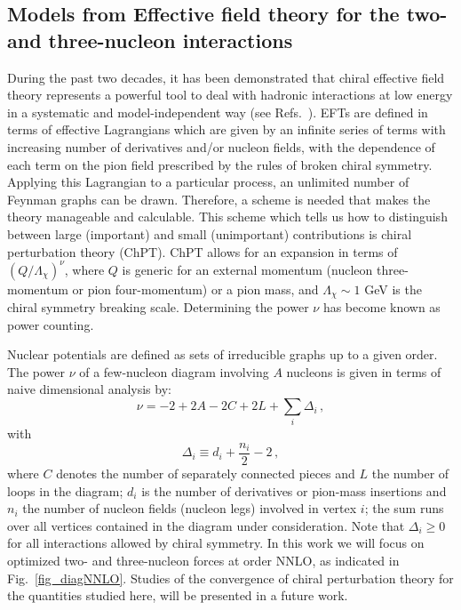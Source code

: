 \subsection{Models from Effective field theory for the two- and three-nucleon interactions}\label{subsec:forcemodels}

During the past two decades, it has been demonstrated that chiral
effective field theory represents a powerful tool to deal with
hadronic interactions at low energy in a systematic and
model-independent way (see
Refs.~\cite{weinberg1990,weinberg1991,ordonez1992,ordonez1994,ordonez1996,vankolck1999,machleidt2011,epelbaum2009,ekstrom2013}).
EFTs are defined in terms of effective Lagrangians which are given by
an infinite series of terms with increasing number of derivatives
and/or nucleon fields, with the dependence of each term on the pion
field prescribed by the rules of broken chiral symmetry.  Applying
this Lagrangian to a particular process, an unlimited number of
Feynman graphs can be drawn. Therefore, a scheme is needed that makes
the theory manageable and calculable.  This scheme which tells us how
to distinguish between large (important) and small (unimportant)
contributions is chiral perturbation theory (ChPT).  ChPT allows for
an expansion in terms of $(Q/\Lambda_\chi)^\nu$, where $Q$ is generic
for an external momentum (nucleon three-momentum or pion
four-momentum) or a pion mass, and $\Lambda_\chi \sim 1$ GeV is the
chiral symmetry breaking scale.  Determining the power $\nu$ has
become known as power counting.

Nuclear potentials are defined as sets of irreducible
graphs up to a given order.
The power $\nu$ of a few-nucleon diagram involving $A$ nucleons
is given in terms of naive dimensional analysis by:
\begin{equation} 
\nu = -2 +2A - 2C + 2L 
+ \sum_i \Delta_i \, ,  
\label{eq_nu} 
\end{equation}
with
\begin{equation}
\Delta_i  \equiv   d_i + \frac{n_i}{2} - 2  \, ,
\label{eq_Deltai}
\end{equation}
where $C$ denotes the number of separately connected pieces and
$L$ the number of loops in the diagram;
$d_i$ is the number of derivatives or pion-mass insertions and $n_i$ the number of nucleon fields 
(nucleon legs) involved in vertex $i$; the sum runs over all vertices contained
in the diagram under consideration.
Note that $\Delta_i \geq 0$
for all interactions allowed by chiral symmetry.   In this work we will focus on optimized two- and three-nucleon forces  at order 
NNLO, as indicated in Fig.~\ref{fig_diagNNLO}.   Studies of the convergence of chiral perturbation theory for the quantities studied here, will be
presented in  a future work.  

